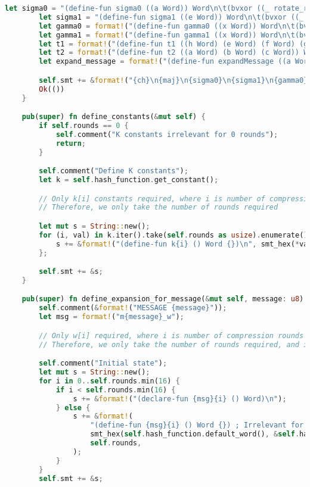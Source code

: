 \begin{lstlisting}[language=rust, caption={smt\_lib/encodings/generic\_shared.rs}]
		let sigma0 = "(define-fun sigma0 ((a Word)) Word\n\t(bvxor ((_ rotate_right 2) a) ((_ rotate_right 13) a) ((_ rotate_right 22) a))\n)";
		let sigma1 = "(define-fun sigma1 ((e Word)) Word\n\t(bvxor ((_ rotate_right 6) e) ((_ rotate_right 11) e) ((_ rotate_right 25) e))\n)";
		let gamma0 = format!("(define-fun gamma0 ((x Word)) Word\n\t(bvxor ((_ rotate_right 7) x) ((_ rotate_right 18) x) (bvlshr x (_ bv3 {word_size})))\n)");
		let gamma1 = format!("(define-fun gamma1 ((x Word)) Word\n\t(bvxor ((_ rotate_right 17) x) ((_ rotate_right 19) x) (bvlshr x (_ bv10 {word_size})))\n)");
		let t1 = format!("(define-fun t1 ((h Word) (e Word) (f Word) (g Word) (k Word) (w Word)) Word\n\t{t1_add}\n)");
		let t2 = format!("(define-fun t2 ((a Word) (b Word) (c Word)) Word\n\t{t2_add}\n)");
		let expand_message = format!("(define-fun expandMessage ((a Word) (b Word) (c Word) (d Word)) Word\n\t{expand_message_add}\n)");

		self.smt += &format!("{ch}\n{maj}\n{sigma0}\n{sigma1}\n{gamma0}\n{gamma1}\n{t1}\n{t2}\n{expand_message}");
		Ok(())
	}

	pub(super) fn define_constants(&mut self) {
		if self.rounds == 0 {
			self.comment("K constants irrelevant for 0 rounds");
			return;
		}

		self.comment("Define K constants");
		let k = self.hash_function.get_constant();

		// Only k[i] constants required, where i is number of compression rounds
		// Therefore, we only take the number of rounds required

		let mut s = String::new();
		for (i, val) in k.iter().take(self.rounds as usize).enumerate() {
			s += &format!("(define-fun k{i} () Word {})\n", smt_hex(*val, &self.hash_function))
		};

		self.smt += &s;
	}

	pub(super) fn define_expansion_for_message(&mut self, message: u8) {
		self.comment(&format!("MESSAGE {message}"));
		let msg = format!("m{message}_w");

		// Only w[i] required, where i is number of compression rounds
		// Therefore, we only take the number of rounds required, and initialize the first 16 as 0.

		self.comment("Initial state");
		let mut s = String::new();
		for i in 0..self.rounds.min(16) {
			if i < self.rounds.min(16) {
				s += &format!("(declare-fun {msg}{i} () Word)\n");
			} else {
				s += &format!(
					"(define-fun {msg}{i} () Word {}) ; Irrelevant for {} rounds\n",
					smt_hex(self.hash_function.default_word(), &self.hash_function),
					self.rounds,
				);
			}
		}
		self.smt += &s;


\end{lstlisting}
